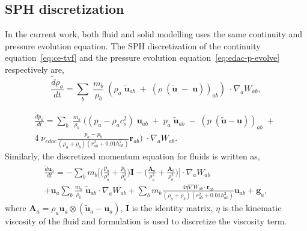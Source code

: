 \documentclass[preprint,12pt]{elsarticle}
\newcommand{\ten}[1]{\ensuremath{\mathbf{#1}}}
\begin{document}
\subsection{SPH discretization}

In the current work, both fluid and solid modelling uses the same continuity
and pressure evolution equation. The SPH discretization of the continuity
equation~\eqref{eq:ce-tvf} and the pressure evolution
equation~\eqref{eq:edac-p-evolve} respectively are,
\begin{equation}
  \label{eq:sph-discretization-continuity}
  \frac{\tilde{d}\rho_a}{dt} = \sum_{b} \; \frac{m_b}{\rho_{b}} \; (
  \rho_{a} \; \tilde{\ten{u}}_{ab} \; + \;
  (\rho \; (\tilde{\ten{u}} \; - \;
  \ten{u}))_{ab}) \; \cdot \nabla_{a} W_{ab},
\end{equation}

\begin{multline}
  \label{eq:sph-discretization-edac}
  \frac{\tilde{d}p_a}{dt} = \sum_{b} \; \frac{m_b}{\rho_{b}} \; \bigg(
  (p_{a} - \rho_{a} c_{s}^2) \; \ten{u}_{ab} \; + \;
  p_{a} \; \tilde{\ten{u}}_{ab} \; - \;
  (p \; (\tilde{\ten{u}} - \ten{u}))_{ab} \; + \; \\
  4 \; \nu_{edac}
  \frac{p_a - p_b}{(\rho_a + \rho_b) (r^2_{ab} + 0.01 h_{ab}^{2})} \ten{r}_{ab}
  \bigg) \; \cdot \nabla_{a} W_{ab}.
\end{multline}
%
Similarly, the discretized momentum equation for fluids is written as,
\begin{multline}
  \label{eq:sph-momentum-fluid}
  \frac{\tilde{d}\ten{u}_{a}}{dt} = - \sum_{b} m_b \bigg[
  \bigg(\frac{p_a}{\rho_a^2} + \frac{p_b}{\rho_b^2}\bigg) \ten{I} -
  \bigg(\frac{\ten{A}_a}{\rho_a^2} + \frac{\ten{A}_b}{\rho_b^2}
  \bigg) \bigg]
  \cdot \nabla_{a} W_{ab} \\
  + \ten{u}_{a} \sum_{b} \frac{m_b}{\rho_{b}} \; \tilde{\ten{u}}_{ab} \cdot
  \nabla_{a} W_{ab} + \sum_{b} m_b \frac{4 \eta \nabla W_{ab}\cdot
    \ten{r}_{ab}}{(\rho_a + \rho_b) (r_{ab}^2 + 0.01 h_{ab}^2)} \ten{u}_{ab} +
  \ten{g}_{a},
\end{multline}
where $\ten{A}_a = \rho_a \ten{u}_a \otimes (\ten{\tilde{u}}_a - \ten{u}_a)$,
$\ten{I}$ is the identity matrix, $\eta$ is the kinematic viscosity of the
fluid and \citet{morris1997modeling} formulation is used to discretize the
viscosity term.
\end{document}
